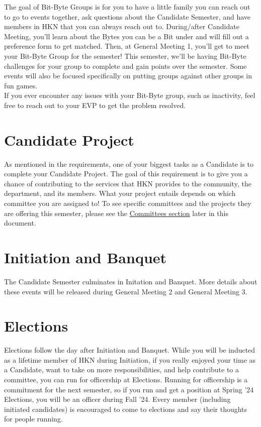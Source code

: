 \documentclass[11pt, article, oneside]{memoir}
\begin{document}
        The goal of Bit-Byte Groups is for you to have a little family you can reach out to go to events together, ask questions about the Candidate Semester, and have members in HKN that you can always reach out to.
        During/after Candidate Meeting, you'll learn about the Bytes you can be a Bit under and will fill out a preference form to get matched.
        Then, at General Meeting 1, you'll get to meet your Bit-Byte Group for the semester!
        This semester, we'll be having Bit-Byte challenges for your group to complete and gain points over the semester.
        Some events will also be focused specifically on putting groups against other groups in fun games. \\

        If you ever encounter any issues with your Bit-Byte group, such as inactivity, feel free to reach out to your EVP to get the problem resolved.

    \section{Candidate Project}
    \label{sec:candidate-project}
        As mentioned in the requirements, one of your biggest tasks as a Candidate is to complete your Candidate Project.
        The goal of this requirement is to give you a chance of contributing to the services that HKN provides to the community, the department, and its members.
        What your project entails depends on which committee you are assigned to!
        To see specific committees and the projects they are offering this semester, please see the \hyperref[ch:committees]{Committees section} later in this document.
        
    \section{Initiation and Banquet}
    \label{sec:initiation-and-banquet}
        The Candidate Semester culminates in Initation and Banquet.
        More details about these events will be released during General Meeting 2 and General Meeting 3.

    \section{Elections}
    \label{sec:elections}
        Elections follow the day after Initiation and Banquet.
        While you will be inducted as a lifetime member of HKN during Initiation, if you really enjoyed your time as a Candidate, want to take on more responsibilities, and help contribute to a committee, you can run for officership at Elections.
        Running for officership is a commitment for the next semester, so if you run and get a position at Spring '24 Elections, you will be an officer during Fall '24.
        Every member (including initiated candidates) is encouraged to come to elections and say their thoughts for people running. \\
        
\end{document}
